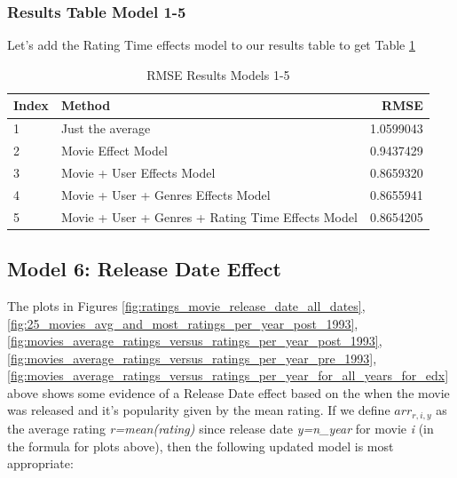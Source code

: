 \documentclass[
]{article}
\begin{document}
\newpage

\hypertarget{results-table-model-1-5}{%
\subsubsection{Results Table Model 1-5}\label{results-table-model-1-5}}

Let's add the Rating Time effects model to our results table to get
Table \ref{tbl:rmse_results_model_1-5}

\begin{table}[H]

\caption{\label{tab:rte_4}RMSE Results Models 1-5\label{tbl:rmse_results_model_1-5}}
\centering
\fontsize{7}{9}\selectfont
\begin{tabular}[t]{llr}
\toprule
Index & Method & RMSE\\
\midrule
1 & Just the average & 1.0599043\\
2 & Movie Effect Model & 0.9437429\\
3 & Movie + User Effects Model & 0.8659320\\
4 & Movie + User + Genres Effects Model & 0.8655941\\
5 & Movie + User + Genres + Rating Time Effects Model & 0.8654205\\
\bottomrule
\end{tabular}
\end{table}

\newpage

\hypertarget{model-6-release-date-effect}{%
\subsection{Model 6: Release Date
Effect}\label{model-6-release-date-effect}}

The plots in Figures \ref{fig:ratings_movie_release_date_all_dates},
\ref{fig:25_movies_avg_and_most_ratings_per_year_post_1993},
\ref{fig:movies_average_ratings_versus_ratings_per_year_post_1993},
\ref{fig:movies_average_ratings_versus_ratings_per_year_pre_1993},
\ref{fig:movies_average_ratings_versus_ratings_per_year_for_all_years_for_edx}
above shows some evidence of a Release Date effect based on the when the
movie was released and it's popularity given by the mean rating. If we
define \(arr_{r,i,y}\) as the average rating \emph{r=mean(rating)} since
release date \emph{y=n\_year} for movie \emph{i} (in the formula for
plots above), then the following updated model is most appropriate:

%
\par
\end{document}
